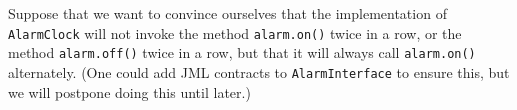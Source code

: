 \documentclass{llncs}
\begin{document}
% 
% 
% 
% 
% 
% 

\medskip

Suppose that we want to convince ourselves that the implementation of 
\texttt{AlarmClock} will not invoke the method \texttt{alarm.on()}
twice in a row, or the method \texttt{alarm.off()} twice in a row,
but that it will always call \texttt{alarm.on()} alternately. 
(One could add JML contracts to \texttt{AlarmInterface} to ensure this,
but we will postpone doing this until later.)
\end{document}
